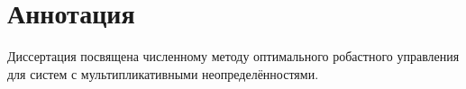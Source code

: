 \chapter*{Аннотация}                         %

Диссертация посвящена численному методу оптимального робастного управления для систем с мультипликативными неопределённостями.